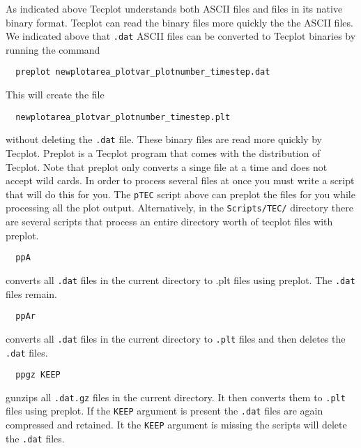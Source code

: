 As indicated above Tecplot understands both ASCII files and files in its
native binary format.  Tecplot can read the binary files more quickly
the the ASCII files.  We indicated above that {\tt .dat} ASCII files 
can be converted to Tecplot binaries by running the command
\begin{verbatim}
  preplot newplotarea_plotvar_plotnumber_timestep.dat
\end{verbatim}
This will create the file 
\begin{verbatim}
  newplotarea_plotvar_plotnumber_timestep.plt
\end{verbatim}
without deleting the {\tt .dat} file. These binary files are read more
quickly by Tecplot.  Preplot is a Tecplot program that comes with the
distribution of Tecplot.  Note that preplot only converts a singe file
at a time and does not accept wild cards.  In order to process several
files at once you must write a script that will do this for you.  The
{\tt pTEC} script above can preplot the files for you while processing
all the plot output.  Alternatively, in the {\tt Scripts/TEC/}
directory there are several scripts that process an entire directory
worth of tecplot files with preplot. 
\begin{verbatim}
  ppA
\end{verbatim}
converts all {\tt .dat} files in the current directory to .plt files using
preplot. The {\tt .dat} files remain.
\begin{verbatim}
  ppAr
\end{verbatim}
converts all {\tt .dat} files in the current directory to {\tt .plt} files 
and then deletes the {\tt .dat} files.
\begin{verbatim}
  ppgz KEEP
\end{verbatim}
gunzips all {\tt .dat.gz} files in the current directory.  It then
converts them to {\tt .plt} files using preplot.  If the {\tt KEEP} argument
is present the {\tt .dat} files are again compressed and retained.  It the 
{\tt KEEP} argument is missing the scripts will delete the {\tt .dat} files.

